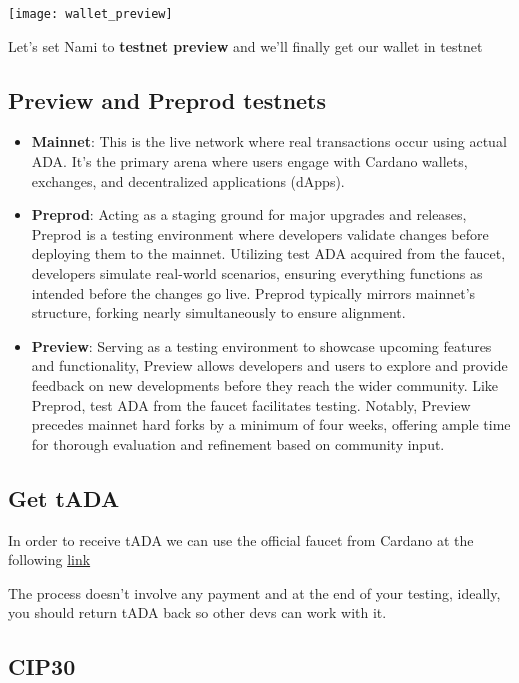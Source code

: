 \texttt{[image: wallet\_preview]}

Let's set Nami to \textbf{testnet preview} and we'll finally get our wallet in testnet 

\subsection{Preview and Preprod testnets}

\begin{itemize}
    \item \textbf{Mainnet}: This is the live network where real transactions occur using actual ADA. It's the primary arena where users engage with Cardano wallets, exchanges, and decentralized applications (dApps).
    \item \textbf{Preprod}: Acting as a staging ground for major upgrades and releases, Preprod is a testing environment where developers validate changes before deploying them to the mainnet. Utilizing test ADA acquired from the faucet, developers simulate real-world scenarios, ensuring everything functions as intended before the changes go live. Preprod typically mirrors mainnet's structure, forking nearly simultaneously to ensure alignment.
    \item \textbf{Preview}: Serving as a testing environment to showcase upcoming features and functionality, Preview allows developers and users to explore and provide feedback on new developments before they reach the wider community. Like Preprod, test ADA from the faucet facilitates testing. Notably, Preview precedes mainnet hard forks by a minimum of four weeks, offering ample time for thorough evaluation and refinement based on community input.
\end{itemize}

\subsection{Get tADA}

In order to receive tADA we can use the official faucet from Cardano at the following \href{https://docs.cardano.org/cardano-testnets/tools/faucet/}{link}

The process doesn't involve any payment and at the end of your testing, ideally, you should return tADA back so other devs can work with it.

\subsection{CIP30}

